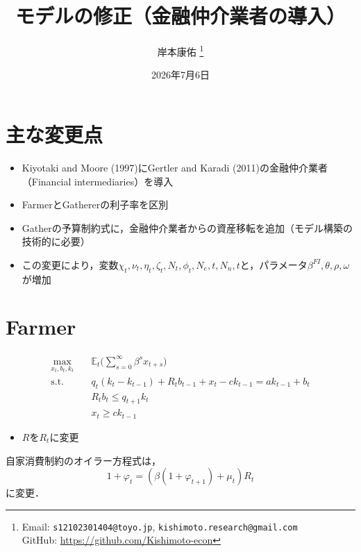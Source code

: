 \documentclass[dvipdfmx]{jlreq}
\title{
\vspace{-4cm}
モデルの修正（金融仲介業者の導入）
}
\author{
  岸本康佑
  \thanks{
  Email: \texttt{s12102301404@toyo.jp}, \texttt{kishimoto.research@gmail.com} \\
  GitHub: \url{https://github.com/Kishimoto-econ}
}}
\date{2026年7月6日}
\begin{document}
\maketitle

\section{主な変更点}
\begin{itemize}
  \item Kiyotaki and Moore (1997)にGertler and Karadi (2011)の金融仲介業者（Financial intermediaries）を導入
  \item FarmerとGathererの利子率を区別
  \item Gatherの予算制約式に，金融仲介業者からの資産移転を追加（モデル構築の技術的に必要）
  \item この変更により，変数$\chi_t, \nu_t, \eta_t, \zeta_t, N_t, \phi_t, N_e,t, N_n,t$と，パラメータ$\beta^{FI}, \theta, \rho, \omega$が増加
\end{itemize}

\section{Farmer}
\begin{align}
  \max_{x_t, b_t, k_t} \quad & \mathbb{E}_t \bigg( \sum_{s=0}^{\infty} \beta^s x_{t+s} \bigg) \label{eq:f_u} \\
  \text{s.t.} \quad & q_t(k_t - k_{t-1}) + R_t b_{t-1} + x_t - c k_{t-1} = a k_{t-1} + b_t \label{eq:f_yosan} \\
  & R_t b_t \leq q_{t+1} k_t \label{eq:kariire}\\
  & x_t \geq c k_{t-1} \label{eq:syouhi}
\end{align}
\begin{itemize}
  \item $R$を$R_t$に変更
\end{itemize}
自家消費制約のオイラー方程式は，
\begin{equation}
  1 + \varphi_t = (\beta(1+\varphi_{t+1}) + \mu_t) R_t
\end{equation}
に変更．
\end{document}
